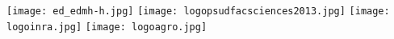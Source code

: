 \documentclass[a4paper,12pt]{article}
\begin{document}
\thispagestyle{empty}
\vspace{-2cm}

\voffset-10pt


\noindent
\hbox{\texttt{[image: ed\_edmh-h.jpg]}} 
\hfill
\hbox{\texttt{[image: logopsudfacsciences2013.jpg]}}
\hfill
\hbox{\texttt{[image: logoinra.jpg]}}
\hfill
\hbox{\texttt{[image: logoagro.jpg]}}

\vspace{7mm}
\end{document}
